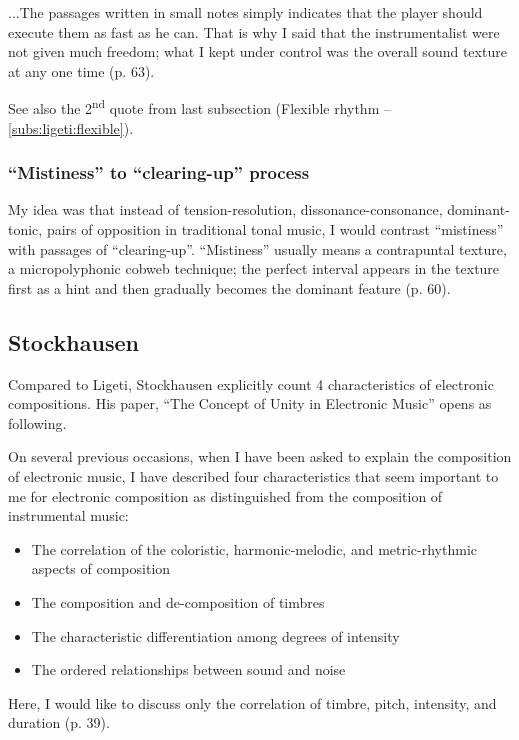 \documentclass[a4paper,11pt]{article}
\newenvironment{MyShadequote}[1][]{%
    \ignorespaces%
    \begin{mdframed}[style=MyShadeQuoteStyle,#1]%
}{%
    \end{mdframed}%
    \ignorespacesafterend%
}%
\begin{document}
\begin{MyShadequote}
  ...The passages written in small notes simply indicates that the player should execute them as fast as he can.
  That is why I said that the instrumentalist were not given much freedom; what I kept under control was the overall sound texture at any one time (p. 63).
\end{MyShadequote}

See also the 2\textsuperscript{nd} quote from last subsection (Flexible rhythm -- \ref{subs:ligeti:flexible}).

\subsubsection{``Mistiness'' to ``clearing-up'' process}
\label{subs:ligeti:mistiness}

\begin{MyShadequote}
  My idea was that instead of tension-resolution, dissonance-consonance, dominant-tonic, pairs of opposition in traditional tonal music, I would contrast ``mistiness'' with passages of ``clearing-up''. ``Mistiness'' usually means a contrapuntal texture, a micropolyphonic cobweb technique; the perfect interval appears in the texture first as a hint and then gradually becomes the dominant feature (p. 60).
\end{MyShadequote}

\subsection{Stockhausen}
\label{sub:eshtetic_stockhausen}

Compared to Ligeti, Stockhausen explicitly count 4 characteristics of electronic compositions.
His paper, ``The Concept of Unity in Electronic Music'' opens as following.

\begin{MyShadequote}
  On several previous occasions, when I have been asked to explain the composition of electronic music, I have described four characteristics that seem important to me for electronic composition as distinguished from the composition of instrumental music:

  \begin{itemize}
    \item The correlation of the coloristic, harmonic-melodic, and metric-rhythmic aspects of composition
    \item The composition and de-composition of timbres
    \item The characteristic differentiation among degrees of intensity
    \item The ordered relationships between sound and noise
  \end{itemize}

  Here, I would like to discuss only the correlation of timbre, pitch, intensity, and duration (p. 39).
\end{MyShadequote}
\end{document}
